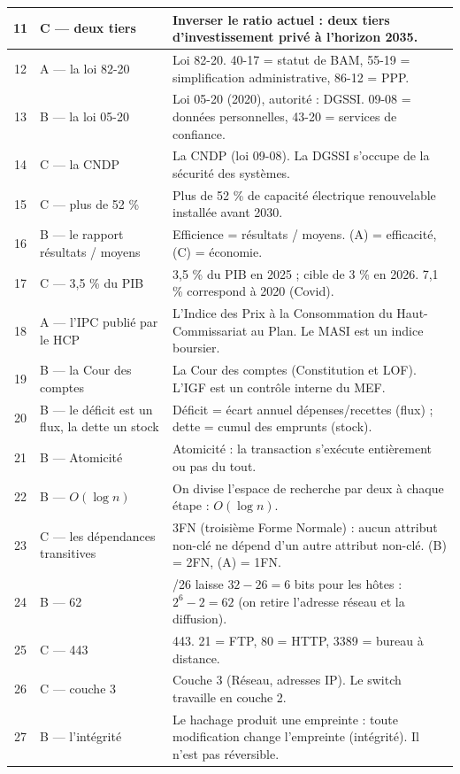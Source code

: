 {\begin{longtable}{|c|>{\raggedright\arraybackslash}p{4.6cm}|p{9.2cm}|}
11 & C --- deux tiers & Inverser le ratio actuel : deux tiers d'investissement privé à l'horizon 2035. \\ \hline
12 & A --- la loi 82-20 & Loi 82-20. 40-17 = statut de BAM, 55-19 = simplification administrative, 86-12 = PPP. \\ \hline
13 & B --- la loi 05-20 & Loi 05-20 (2020), autorité : DGSSI. 09-08 = données personnelles, 43-20 = services de confiance. \\ \hline
14 & C --- la CNDP & La CNDP (loi 09-08). La DGSSI s'occupe de la sécurité des systèmes. \\ \hline
15 & C --- plus de 52 \% & Plus de 52 \% de capacité électrique renouvelable installée avant 2030. \\ \hline
16 & B --- le rapport résultats / moyens & Efficience = résultats / moyens. (A) = efficacité, (C) = économie. \\ \hline
17 & C --- 3,5 \% du PIB & 3,5 \% du PIB en 2025 ; cible de 3 \% en 2026. 7,1 \% correspond à 2020 (Covid). \\ \hline
18 & A --- l'IPC publié par le HCP & L'Indice des Prix à la Consommation du Haut-Commissariat au Plan. Le MASI est un indice boursier. \\ \hline
19 & B --- la Cour des comptes & La Cour des comptes (Constitution et LOF). L'IGF est un contrôle interne du MEF. \\ \hline
20 & B --- le déficit est un flux, la dette un stock & Déficit = écart annuel dépenses/recettes (flux) ; dette = cumul des emprunts (stock). \\ \hline
21 & B --- Atomicité & Atomicité : la transaction s'exécute entièrement ou pas du tout. \\ \hline
22 & B --- $O(\log n)$ & On divise l'espace de recherche par deux à chaque étape : $O(\log n)$. \\ \hline
23 & C --- les dépendances transitives & 3FN (troisième Forme Normale) : aucun attribut non-clé ne dépend d'un autre attribut non-clé. (B) = 2FN, (A) = 1FN. \\ \hline
24 & B --- 62 & /26 laisse $32 - 26 = 6$ bits pour les hôtes : $2^6 - 2 = 62$ (on retire l'adresse réseau et la diffusion). \\ \hline
25 & C --- 443 & 443. 21 = FTP, 80 = HTTP, 3389 = bureau à distance. \\ \hline
26 & C --- couche 3 & Couche 3 (Réseau, adresses IP). Le switch travaille en couche 2. \\ \hline
27 & B --- l'intégrité & Le hachage produit une empreinte : toute modification change l'empreinte (intégrité). Il n'est pas réversible. \\ \hline

\end{longtable}}
